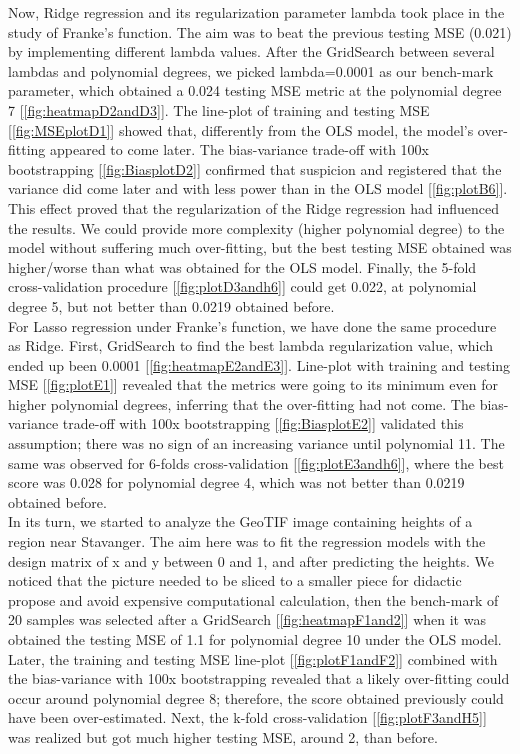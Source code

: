 Now, Ridge regression and its regularization parameter lambda took place in the study of Franke's function. The aim was to beat the previous testing MSE (0.021) by implementing different lambda values. After the GridSearch between several lambdas and polynomial degrees, we picked lambda=0.0001 as our bench-mark parameter, which obtained a 0.024 testing MSE metric at the polynomial degree 7 [\ref{fig:heatmapD2andD3}]. The line-plot of training and testing MSE [\ref{fig:MSEplotD1}] showed that, differently from the OLS model, the model's over-fitting appeared to come later. The bias-variance trade-off with 100x bootstrapping [\ref{fig:BiasplotD2}] confirmed that suspicion and registered that the variance did come later and with less power than in the OLS model [\ref{fig:plotB6}]. This effect proved that the regularization of the Ridge regression had influenced the results. We could provide more complexity (higher polynomial degree) to the model without suffering much over-fitting, but the best testing MSE obtained was higher/worse than what was obtained for the OLS model. Finally, the 5-fold cross-validation procedure [\ref{fig:plotD3andh6}] could get 0.022, at polynomial degree 5, but not better than 0.0219 obtained before.\\

For Lasso regression under Franke's function, we have done the same procedure as Ridge. First, GridSearch to find the best lambda regularization value, which ended up been 0.0001 [\ref{fig:heatmapE2andE3}]. Line-plot with training and testing MSE [\ref{fig:plotE1}] revealed that the metrics were going to its minimum even for higher polynomial degrees, inferring that the over-fitting had not come. The bias-variance trade-off with 100x bootstrapping [\ref{fig:BiasplotE2}] validated this assumption; there was no sign of an increasing variance until polynomial 11. The same was observed for 6-folds cross-validation [\ref{fig:plotE3andh6}], where the best score was 0.028 for polynomial degree 4, which was not better than 0.0219 obtained before.\\

In its turn, we started to analyze the GeoTIF image containing heights of a region near Stavanger. The aim here was to fit the regression models with the design matrix of x and y between 0 and 1, and after predicting the heights. We noticed that the picture needed to be sliced to a smaller piece for didactic propose and avoid expensive computational calculation, then the bench-mark of 20 samples was selected after a GridSearch [\ref{fig:heatmapF1and2}] when it was obtained the testing MSE of 1.1 for polynomial degree 10 under the OLS model. Later, the training and testing MSE line-plot [\ref{fig:plotF1andF2}] combined with the bias-variance with 100x bootstrapping revealed that a likely over-fitting could occur around polynomial degree 8; therefore, the score obtained previously could have been over-estimated. Next, the k-fold cross-validation [\ref{fig:plotF3andH5}] was realized but got much higher testing MSE, around 2, than before.\\

